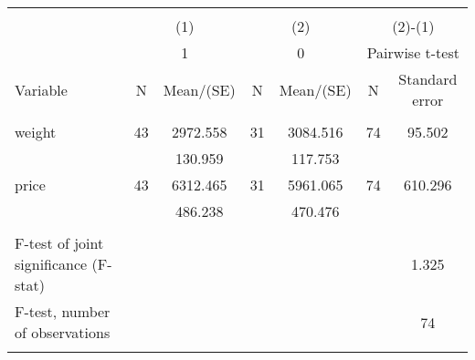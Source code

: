 \begin{tabular}{@{\extracolsep{5pt}}lcccccc}
\\[-1.8ex]\hline \hline \\[-1.8ex]
 & \multicolumn{2}{c}{(1)}  & \multicolumn{2}{c}{(2)}  & \multicolumn{2}{c}{(2)-(1)} \\
 & \multicolumn{2}{c}{1}  & \multicolumn{2}{c}{0}  & \multicolumn{2}{c}{Pairwise t-test}  \\
Variable & N & Mean/(SE) & N & Mean/(SE) & N & Standard error \\ \hline \\[-1.8ex] 
weight   & 43    &  2972.558    & 31    &  3084.516    & 74    &    95.502   \\
 &   &   130.959  &   &   117.753  &   &   \\
price   & 43    &  6312.465    & 31    &  5961.065    & 74    &   610.296   \\
 &   &   486.238  &   &   470.476  &   &   \\
\hline \\[-1.8ex]
F-test of joint significance (F-stat) & &   & &     & &      1.325   \\
F-test, number of observations & &   & &   & &  74   \\
\hline \\[-1.8ex]

\end{tabular}
